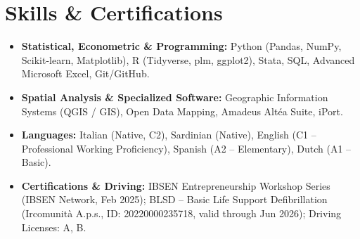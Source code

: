 \documentclass[10pt,a4paper]{article}
\begin{document}
\section{Skills \& Certifications}

\begin{itemize}[leftmargin=10pt]
    \item \textbf{Statistical, Econometric \& Programming:} Python (Pandas, NumPy, Scikit-learn, Matplotlib), R (Tidyverse, plm, ggplot2), Stata, SQL, Advanced Microsoft Excel, Git/GitHub.
    \item \textbf{Spatial Analysis \& Specialized Software:} Geographic Information Systems (QGIS / GIS), Open Data Mapping, Amadeus Altéa Suite, iPort.
    \item \textbf{Languages:} Italian (Native, C2), Sardinian (Native), English (C1 -- Professional Working Proficiency), Spanish (A2 -- Elementary), Dutch (A1 -- Basic).
    \item \textbf{Certifications \& Driving:} IBSEN Entrepreneurship Workshop Series (IBSEN Network, Feb 2025); BLSD -- Basic Life Support Defibrillation (Ircomunità A.p.s., ID: 20220000235718, valid through Jun 2026); Driving Licenses: A, B.
\end{itemize}
\end{document}
